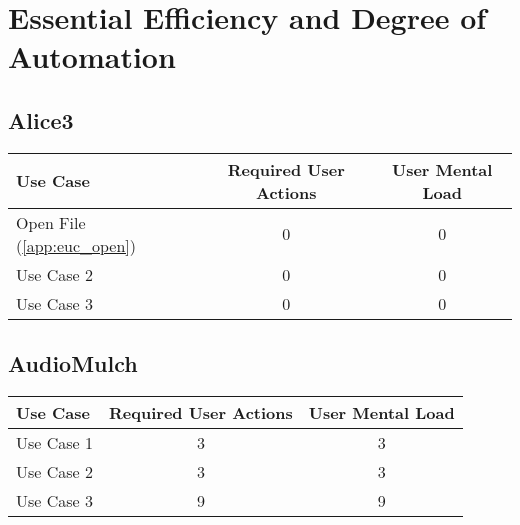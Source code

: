 \section{Essential Efficiency and Degree of Automation}

\subsection*{Alice3}

\begin{tabularx}{\textwidth}{Xcc}
\textbf{Use Case} & \textbf{Required User Actions} & \textbf{User Mental Load}\\
\hline
Open File (\ref{app:euc_open}) & {\color{red}0} & {\color{red}0} \\
Use Case 2                     & {\color{red}0} & {\color{red}0} \\
Use Case 3                     & {\color{red}0} & {\color{red}0}
\end{tabularx}

\subsection*{AudioMulch}




\begin{tabularx}{\textwidth}{Xcc}
\textbf{Use Case} & \textbf{Required User Actions} & \textbf{User Mental Load}\\
\hline
Use Case 1                          & 3 & 3 \\
Use Case 2                          & 3 & 3 \\
Use Case 3                          & 9 & 9
\end{tabularx}

